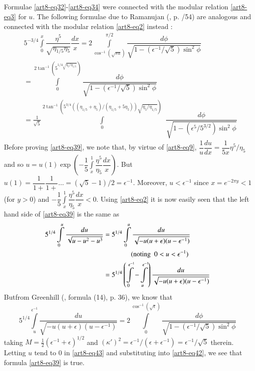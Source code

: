 \subsection{}\label{art8-sec3.5}
Formulae \eqref{art8-eq32}-\eqref{art8-eq34} were connected with the modular relation \eqref{art8-eq3} for $u$. The following formulae due to Ramanujan (\cite{art8-key11}, p. /54) are analogous and connected with the modular relation \eqref{art8-eq2} instead :
\begin{align}
& 5^{-3/4}\int\limits^{x}_{0}\dfrac{\eta^{5}}{\sqrt{\eta_{1/5}\eta_{5}}}\dfrac{dx}{x}=2\int\limits^{\pi/2}_{\cos^{-1}(\sqrt{su})}\dfrac{d\phi}{\sqrt{1-(\epsilon^{-1}/\sqrt{5})\sin^{2}\phi}}\label{art8-eq39}\\
&= \int\limits^{2\tan^{-1}(5^{1/4\sqrt{\eta_{5}/\eta_{1/5}}})}_{0}\dfrac{d\phi}{\sqrt{1-(\epsilon^{-1}/\sqrt{5})\sin^{2}\phi}}\label{art8-eq40}\\
&=\frac{1}{\sqrt{5}}\int\limits^{2\tan^{-1}(5^{3/4}((\eta_{1/5}+\eta_{5})/(\eta_{1/5}+5\eta_{5}))\sqrt{\eta_{5}/\eta_{1/5}})}_{0} \ \ \dfrac{d\phi}{\sqrt{1-(\epsilon^{5}/5^{3/2})\sin^{2}\phi}}\label{art8-eq41}
\end{align}
Before proving \eqref{art8-eq39}, we note that, by virtue of \eqref{art8-eq9}, $\dfrac{1}{u}\dfrac{du}{dx}=\dfrac{1}{5x}\eta^{5}/\eta_{5}$ and so $u=u(1)\exp \left(-\dfrac{1}{5}\int\limits^{1}_{x}\dfrac{\eta^{5}}{\eta_{5}}\dfrac{dx}{x}\right)$. But $u(1)=\dfrac{1}{1+}\dfrac{1}{1+}\ldots=(\sqrt{5}-1)/2=\epsilon^{-1}$. Moreover, $u<\epsilon^{-1}$ since $x=e^{-2\pi y}<1$ (for $y>0$) and $-\dfrac{1}{5}\int\limits^{1}_{x}\dfrac{\eta^{5}}{\eta_{5}}\dfrac{dx}{x}<0$. Using \eqref{art8-eq2} it is now easily seen that the left hand side of \eqref{art8-eq39} is the same as
\begin{align}
5^{1/4}\int\limits^{u}_{0}\dfrac{du}{\sqrt{u-u^{2}-u^{3}}} &= 5^{1/4}\int\limits^{u}_{0}\dfrac{du}{\sqrt{-u(u+\epsilon)(u-\epsilon^{-1})}}\notag\\
&\qquad\qquad (\text{noting~ } 0<u<\epsilon^{-1})\notag\\
&= 5^{1/4}\left(\int\limits^{\epsilon^{-1}}_{0}-\int\limits^{\epsilon^{-1}}_{u}\right)\dfrac{du}{\sqrt{-u(u+\epsilon)(u-\epsilon^{-1})}}\label{art8-eq42}
\end{align}
But\pageoriginale from Greenhill (\cite{art8-key4}, formula (14), p. 36), we know that
\begin{equation*}
5^{1/4}\int\limits^{\epsilon^{-1}}_{u}\dfrac{du}{\sqrt{-u(u+\epsilon)(u-\epsilon^{-1})}}=2\int\limits^{\cos^{-1}(\sqrt{\epsilon})}_{0}\dfrac{d\phi}{\sqrt{1-(\epsilon^{-1}/\sqrt{5})\sin^{2}\phi}}
\end{equation*}
taking $M=\frac{1}{2}(\epsilon^{-1}+\epsilon)^{1/2}$ and $(\kappa')^{2}=\epsilon^{-1}/(\epsilon+\epsilon^{-1})=\epsilon^{-1}/\sqrt{5}$ therein. Letting $u$ tend to $0$ in \eqref{art8-eq43} and substituting into \eqref{art8-eq42}, we see that formula \eqref{art8-eq39} is true.

